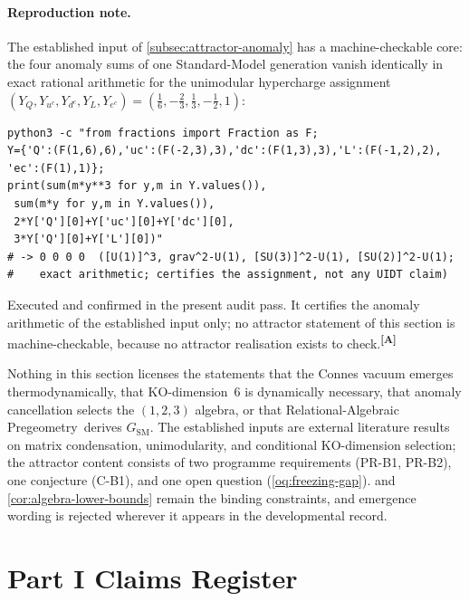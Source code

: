 \documentclass[12pt,a4paper,twoside]{article}
\theoremstyle{plain}
\theoremstyle{definition}
\theoremstyle{remark}
\newcommand{\ProjectShort}{Relational-Algebraic Pregeometry}
\newcommand{\RAP}{\ProjectShort}
\newcommand{\catmark}[1]{\textsuperscript{\textsf{\textbf{[#1]}}}}
\begin{document}
\paragraph{Reproduction note.}
The established input of \cref{subsec:attractor-anomaly} has a
machine-checkable core: the four anomaly sums of one Standard-Model
generation vanish identically in exact rational arithmetic for the
unimodular hypercharge assignment
$(Y_Q,Y_{u^c},Y_{d^c},Y_L,Y_{e^c})=(\tfrac{1}{6},-\tfrac{2}{3},\tfrac{1}{3},-\tfrac{1}{2},1)$:
\begin{verbatim}
python3 -c "from fractions import Fraction as F;
Y={'Q':(F(1,6),6),'uc':(F(-2,3),3),'dc':(F(1,3),3),'L':(F(-1,2),2),
'ec':(F(1),1)};
print(sum(m*y**3 for y,m in Y.values()),
 sum(m*y for y,m in Y.values()),
 2*Y['Q'][0]+Y['uc'][0]+Y['dc'][0],
 3*Y['Q'][0]+Y['L'][0])"
# -> 0 0 0 0  ([U(1)]^3, grav^2-U(1), [SU(3)]^2-U(1), [SU(2)]^2-U(1);
#    exact arithmetic; certifies the assignment, not any UIDT claim)
\end{verbatim}
Executed and confirmed in the present audit pass. It certifies the
anomaly arithmetic of the established input only; no attractor statement
of this section is machine-checkable, because no attractor realisation
exists to check.\catmark{A}

\begin{governancebox}
Nothing in this section licenses the statements that the Connes vacuum
emerges thermodynamically, that KO-dimension~6 is dynamically necessary,
that anomaly cancellation selects the $(1,2,3)$ algebra, or that \RAP\
derives $G_{\mathrm{SM}}$. The established inputs are external literature
results on matrix condensation, unimodularity, and conditional
KO-dimension selection; the attractor content consists of two programme
requirements (PR-B1, PR-B2), one conjecture (C-B1), and one open question
(\cref{oq:freezing-gap}). \Cref{thm:gap-localisation} and
\cref{cor:algebra-lower-bounds} remain the binding constraints, and
emergence wording is rejected wherever it appears in the developmental
record.
\end{governancebox}


\newpage
\section{Part I Claims Register}
\label{sec:part1-claims}
\end{document}
